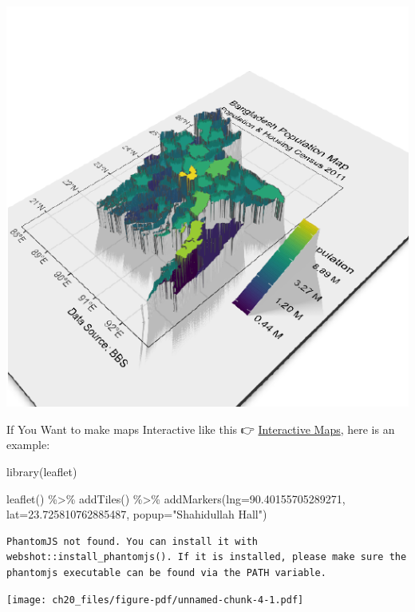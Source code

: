 \documentclass[
  letterpaper,
]{scrbook}
\newenvironment{Shaded}{\begin{snugshade}}{\end{snugshade}}
\newcommand{\AttributeTok}[1]{\textcolor[rgb]{0.40,0.45,0.13}{#1}}
\newcommand{\FloatTok}[1]{\textcolor[rgb]{0.68,0.00,0.00}{#1}}
\newcommand{\FunctionTok}[1]{\textcolor[rgb]{0.28,0.35,0.67}{#1}}
\newcommand{\NormalTok}[1]{\textcolor[rgb]{0.00,0.23,0.31}{#1}}
\newcommand{\SpecialCharTok}[1]{\textcolor[rgb]{0.37,0.37,0.37}{#1}}
\newcommand{\StringTok}[1]{\textcolor[rgb]{0.13,0.47,0.30}{#1}}
\begin{document}
\includegraphics{ch20_files/figure-pdf/unnamed-chunk-3-1.pdf}

If You Want to make maps Interactive like this 👉
\href{https://rana2hin.quarto.pub/mapsinbooks/}{Interactive Maps}, here
is an example:

\begin{Shaded}
\begin{Highlighting}[]
\FunctionTok{library}\NormalTok{(leaflet)}

\FunctionTok{leaflet}\NormalTok{() }\SpecialCharTok{\%\textgreater{}\%}
  \FunctionTok{addTiles}\NormalTok{() }\SpecialCharTok{\%\textgreater{}\%} 
  \FunctionTok{addMarkers}\NormalTok{(}\AttributeTok{lng=}\FloatTok{90.40155705289271}\NormalTok{, }\AttributeTok{lat=}\FloatTok{23.725810762885487}\NormalTok{, }\AttributeTok{popup=}\StringTok{"Shahidullah Hall"}\NormalTok{)}
\end{Highlighting}
\end{Shaded}

\begin{verbatim}
PhantomJS not found. You can install it with webshot::install_phantomjs(). If it is installed, please make sure the phantomjs executable can be found via the PATH variable.
\end{verbatim}

\texttt{[image: ch20\_files/figure-pdf/unnamed-chunk-4-1.pdf]}
\end{document}
